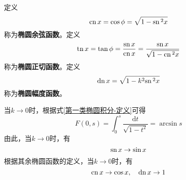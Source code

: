定义
\begin{equation}
	\mathrm{cn}\, x = \cos \phi = \sqrt{1-\mathrm{sn}\,^2 x}
\end{equation}
称为{\bf 椭圆余弦函数}。定义
\begin{equation}
	\mathrm{tn}\, x = \tan \phi = \frac{\mathrm{sn}\, x}{\mathrm{cn}\, x} = \frac{\mathrm{sn}\, x}{\sqrt{1-\mathrm{cn}\,^2 x}}
\end{equation}
称为{\bf 椭圆正切函数}。定义
\begin{equation}
	\mathrm{dn}\, x = \sqrt{1-k^2\mathrm{sn}\,^2x}
\end{equation}
称为{\bf 椭圆幅度函数}。

当$k\to 0$时，根据式\eqref{第一类椭圆积分-定义}可得
\begin{equation*}
	F(0,s) = \int_0^s \frac{\mathrm{d}t}{\sqrt{1-t^2}} = \arcsin s
\end{equation*}
由此，当$k\to 0$时，有
\begin{equation}
	\mathrm{sn}\, x \to \sin x
\end{equation}
根据其余椭圆函数的定义，当$k\to 0$时，有
\begin{equation}
	\mathrm{cn}\, x \to \cos x,\quad \mathrm{dn}\, x \to 1
\end{equation}

